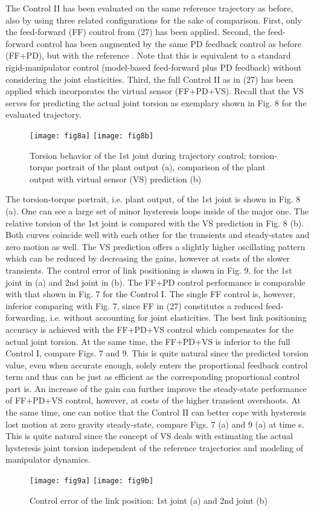 \documentclass[a4paper, 10pt, conference]{ieeeconf}
\begin{document}
The Control II has been evaluated on the same reference trajectory
as before, also by using three related configurations for the sake
of comparison. First, only the feed-forward (FF) control
 from (27) has been applied. Second, the feed-forward
control has been augmented by the same PD feedback control as
before (FF+PD), but with the reference . Note
that this is equivalent to a standard rigid-manipulator control
(model-based feed-forward plus PD feedback) without considering
the joint elasticities. Third, the full Control II as in (27) has
been applied which incorporates the virtual sensor (FF+PD+VS).
Recall that the VS serves for predicting the actual joint torsion
as exemplary shown in Fig. 8 for the evaluated trajectory.
\begin{figure}[!h]
\centering
\texttt{[image: fig8a]}
\texttt{[image: fig8b]}
\caption{Torsion behavior of the 1st joint during trajectory
control; torsion-torque portrait of the plant output (a),
comparison of the plant output with virtual sensor (VS) prediction
(b)} \label{fig:Control2_Hyst}
\end{figure}
The torsion-torque portrait, i.e. plant output, of the 1st joint
is shown in Fig. 8 (a). One can see a large set of minor
hysteresis loops inside of the major one. The relative torsion of
the 1st joint is compared with the VS prediction in Fig. 8 (b).
Both curves coincide well with each other for the transients and
steady-states and zero motion as well. The VS prediction offers a
slightly higher oscillating pattern which can be reduced by
decreasing the  gains, however at costs of the slower
transients. The control error of link positioning is shown in Fig.
9, for the 1st joint in (a) and 2nd joint in (b). The FF+PD
control performance is comparable with that shown in Fig. 7 for
the Control I. The single FF control is, however, inferior
comparing with Fig. 7, since FF in (27) constitutes a reduced
feed-forwarding, i.e. without accounting for joint elasticities.
The best link positioning accuracy is achieved with the FF+PD+VS
control which compensates for the actual joint torsion. At the
same time, the FF+PD+VS is inferior to the full Control I, compare
Figs. 7 and 9. This is quite natural since the predicted torsion
value, even when accurate enough, solely enters the proportional
feedback control term and thus can be just as efficient as the
corresponding proportional control part is. An increase of the
 gain can further improve the steady-state performance of
FF+PD+VS control, however, at costs of the higher transient
overshoots. At the same time, one can notice that the Control II
can better cope with hysteresis lost motion at zero gravity
steady-state, compare Figs. 7 (a) and 9 (a) at time  s.
This is quite natural since the concept of VS deals with
estimating the actual hysteresis joint torsion independent of the
reference trajectories and modeling of manipulator dynamics.
\begin{figure}[!h]
\centering
\texttt{[image: fig9a]}
\texttt{[image: fig9b]}
\caption{Control error of the link position: 1st joint (a) and 2nd
joint (b)} \label{fig:control2error}
\end{figure}
\end{document}
